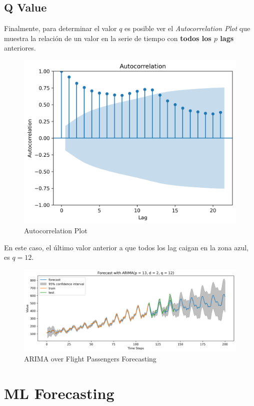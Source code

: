 \subsection{Q Value}
Finalmente, para determinar el valor $q$ es posible ver el \textit{Autocorrelation Plot} que muestra la relación de un valor en la serie de tiempo con \textbf{todos los $p$ lags} anteriores. 
\begin{figure}[H]
    \center
    \includegraphics[scale=0.5]{notebooks/TS/img/autocorrelation.png}
    \caption{Autocorrelation Plot}
\end{figure}
En este caso, el último valor anterior a que todos los lag caigan en la zona azul, es $q=12$.
\begin{figure}[H]
    \center
    \includegraphics[scale=0.5]{notebooks/TS/img/arima_results.png}
    \caption{ARIMA over Flight Passengers Forecasting}
\end{figure}

\section{ML Forecasting}

